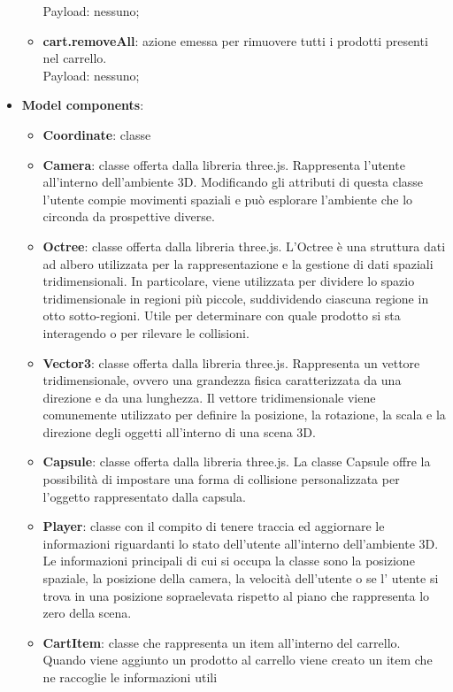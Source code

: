 \begin{itemize}
\begin{itemize}
			Payload: nessuno;
			\item \textbf{cart.removeAll}: azione emessa per rimuovere tutti i prodotti presenti nel carrello.
			\\
			Payload: nessuno;
		\end{itemize}
		\item \textbf{\large Model components}:
		\begin{itemize}
			\item \textbf{Coordinate}: classe 
			\item \textbf{Camera}: classe offerta dalla libreria three.js.
			Rappresenta l'utente all'interno dell'ambiente 3D.
			Modificando gli attributi di questa classe l'utente compie movimenti spaziali e può esplorare l'ambiente che 
			lo circonda da prospettive diverse.
			\item \textbf{Octree}: classe offerta dalla libreria three.js.
			L'Octree è una struttura dati ad albero utilizzata per la rappresentazione e la gestione di dati spaziali 
			tridimensionali. 
			In particolare, viene utilizzata per dividere lo spazio tridimensionale in regioni più piccole, 
			suddividendo ciascuna regione in otto sotto-regioni.
			Utile per determinare con quale prodotto si sta interagendo o per rilevare le collisioni.
			\item \textbf{Vector3}: classe offerta dalla libreria three.js.
			Rappresenta un vettore tridimensionale, ovvero una grandezza fisica caratterizzata da una direzione e da una lunghezza.
			Il vettore tridimensionale viene comunemente utilizzato per definire la posizione, la rotazione, 
			la scala e la direzione degli oggetti all'interno di una scena 3D. 
			\item \textbf{Capsule}: classe offerta dalla libreria three.js.
			La classe Capsule offre la possibilità di impostare una forma di collisione personalizzata 
			per l'oggetto rappresentato dalla capsula. 
			\item \textbf{Player}: classe con il compito di tenere traccia ed aggiornare le informazioni riguardanti 
			lo stato dell'utente all'interno dell'ambiente 3D.
			Le informazioni principali di cui si occupa la classe sono la posizione spaziale, la posizione della camera,
			la velocità dell'utente o se l' utente si trova in una posizione sopraelevata rispetto al piano che rappresenta 
			lo zero della scena.
			\item \textbf{CartItem}: classe che rappresenta un item all'interno del carrello.
			Quando viene aggiunto un prodotto al carrello viene creato un item che ne raccoglie le informazioni utili 

\end{itemize}
\end{itemize}
